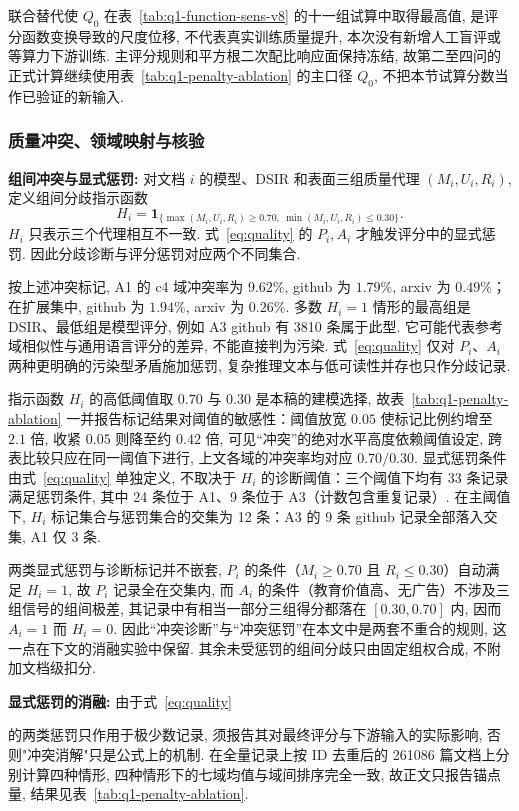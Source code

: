 联合替代使 $Q_0$ 在表~\ref{tab:q1-function-sens-v8} 的十一组试算中取得最高值, 是评分函数变换导致的尺度位移, 不代表真实训练质量提升, 本次没有新增人工盲评或等算力下游训练. 主评分规则和平方根二次配比响应面保持冻结, 故第二至四问的正式计算继续使用表~\ref{tab:q1-penalty-ablation} 的主口径 $Q_0$, 不把本节试算分数当作已验证的新输入. 

\subsubsection{质量冲突、领域映射与核验}

\textbf{组间冲突与显式惩罚: }
对文档 $i$ 的模型、DSIR 和表面三组质量代理 $(M_i, U_i, R_i)$, 定义组间分歧指示函数
\[
H_i=\mathbf 1_{\{\max(M_i, U_i, R_i)\ge0.70, \ \min(M_i, U_i, R_i)\le0.30\}}.
\]
$H_i$ 只表示三个代理相互不一致. 式~\eqref{eq:quality} 的 $P_i, A_i$ 才触发评分中的显式惩罚. 因此分歧诊断与评分惩罚对应两个不同集合. 

按上述冲突标记, A1 的 c4 域冲突率为 $9.62\%$, github 为 $1.79\%$, arxiv 为 $0.49\%$；在扩展集中, github 为 $1.94\%$, arxiv 为 $0.26\%$. 多数 $H_i=1$ 情形的最高组是 DSIR、最低组是模型评分, 例如 A3 github 有 3810 条属于此型. 它可能代表参考域相似性与通用语言评分的差异, 不能直接判为污染. 式~\eqref{eq:quality} 仅对 $P_i$、$A_i$ 两种更明确的污染型矛盾施加惩罚, 复杂推理文本与低可读性并存也只作分歧记录. 

指示函数 $H_i$ 的高低阈值取 $0.70$ 与 $0.30$ 是本稿的建模选择, 故表~\ref{tab:q1-penalty-ablation} 一并报告标记结果对阈值的敏感性：阈值放宽 $0.05$ 使标记比例约增至 $2.1$ 倍, 收紧 $0.05$ 则降至约 $0.42$ 倍, 可见``冲突''的绝对水平高度依赖阈值设定, 跨表比较只应在同一阈值下进行, 上文各域的冲突率均对应 $0.70/0.30$. 显式惩罚条件由式~\eqref{eq:quality} 单独定义, 不取决于 $H_i$ 的诊断阈值：三个阈值下均有 33 条记录满足惩罚条件, 其中 24 条位于 A1、9 条位于 A3（计数包含重复记录）. 在主阈值下, $H_i$ 标记集合与惩罚集合的交集为 12 条：A3 的 9 条 github 记录全部落入交集, A1 仅 3 条. 

两类显式惩罚与诊断标记并不嵌套,  $P_i$ 的条件（$M_i\ge0.70$ 且 $R_i\le0.30$）自动满足 $H_i=1$, 故 $P_i$ 记录全在交集内, 而 $A_i$ 的条件（教育价值高、无广告）不涉及三组信号的组间极差, 其记录中有相当一部分三组得分都落在 $[0.30, 0.70]$ 内, 因而 $A_i=1$ 而 $H_i=0$. 因此``冲突诊断''与``冲突惩罚''在本文中是两套不重合的规则, 这一点在下文的消融实验中保留. 其余未受惩罚的组间分歧只由固定组权合成, 不附加文档级扣分. 

\textbf{显式惩罚的消融: \quad}由于式~\eqref{eq:quality} 

的两类惩罚只作用于极少数记录, 须报告其对最终评分与下游输入的实际影响, 否则"冲突消解"只是公式上的机制. 在全量记录上按 ID 去重后的 261086 篇文档上分别计算四种情形, 四种情形下的七域均值与域间排序完全一致, 故正文只报告锚点量, 结果见表~\ref{tab:q1-penalty-ablation}. 

